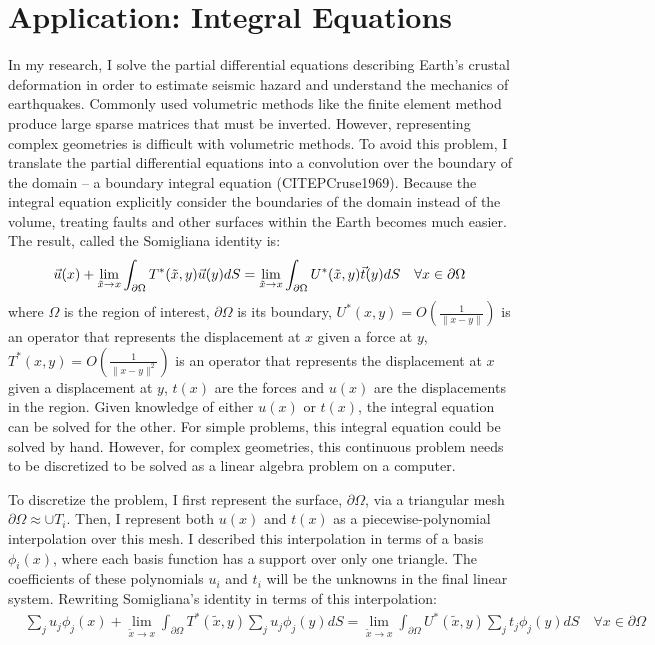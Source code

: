 \documentclass[10pt]{article}
\newcommand{\pO}{\partial \Omega}
\begin{document}
\section*{Application: Integral Equations}
In my research, I solve the partial differential equations describing Earth's crustal deformation in order to estimate seismic hazard and understand the mechanics of earthquakes. Commonly used volumetric methods like the finite element method produce large sparse matrices that must be inverted. However, representing complex geometries is difficult with volumetric methods. To avoid this problem, I translate the partial differential equations into a convolution over the boundary of the domain -- a boundary integral equation (CITEPCruse1969). Because the integral equation explicitly consider the boundaries of the domain instead of the volume, treating faults and other surfaces within the Earth becomes much easier. The result, called the Somigliana identity is:
\begin{equation}
    \vec{u}(x) + \lim_{\tilde{x} \to x}\int_{\pO} T^*(\tilde{x}, y)\vec{u}(y) dS = \lim_{\tilde{x} \to x}\int_{\pO} U^*(\tilde{x},y)\vec{t}(y) dS \quad \forall x \in \pO\\
\end{equation}
where $\Omega$ is the region of interest, $\pO$ is its boundary, $U^*(x,y) = O(\frac{1}{\|x-y\|})$ is an operator that represents the displacement at $x$ given a force at $y$, $T^*(x,y) = O(\frac{1}{\|x - y\|^2})$ is an operator that represents the displacement at $x$ given a displacement at $y$, $t(x)$ are the forces and $u(x)$ are the displacements in the region.  Given knowledge of either $u(x)$ or $t(x)$, the integral equation can be solved for the other. For simple problems, this integral equation could be solved by hand. However, for complex geometries, this continuous problem needs to be discretized to be solved as a linear algebra problem on a computer.

To discretize the problem, I first represent the surface, $\pO$, via a triangular mesh $\pO \approx \cup T_i$. Then, I represent both $u(x)$ and $t(x)$ as a piecewise-polynomial interpolation over this mesh. I described this interpolation in terms of a basis $\phi_i(x)$, where each basis function has a support over only one triangle. The coefficients of these polynomials $u_i$ and $t_i$ will be the unknowns in the final linear system. Rewriting Somigliana's identity in terms of this interpolation:
\begin{align}
    &\displaystyle\sum_ju_j\phi_j(x) + \lim_{\tilde{x} \to x}\int_{\pO} T^*(\tilde{x}, y)\sum_ju_j\phi_j(y) dS = \lim_{\tilde{x} \to x}\int_{\pO} U^*(\tilde{x},y)\sum_jt_j\phi_j(y) dS \quad \forall x \in \pO\\
\end{align}
\end{document}
